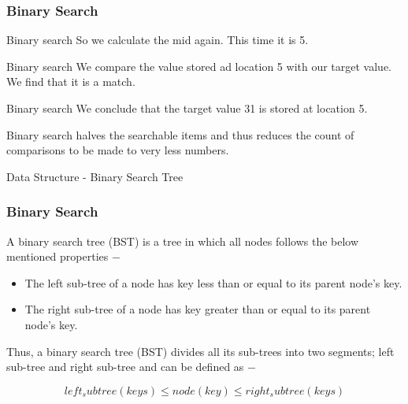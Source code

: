 \documentclass{beamer}
\begin{document}
\begin{frame}
\frametitle{Binary Search}
\large
Binary search
So we calculate the mid again. This time it is 5.

Binary search
We compare the value stored ad location 5 with our target value. We find that it is a match.

Binary search
We conclude that the target value 31 is stored at location 5.

Binary search halves the searchable items and thus reduces the count of comparisons to be made to very less numbers.
\end{frame}
%
%
%
%   
%   
%      
%         
%
%
%   
\begin{frame}

Data Structure - Binary Search Tree

\end{frame}
\begin{frame}
\frametitle{Binary Search}
\large
A binary search tree (BST) is a tree in which all nodes follows the below mentioned properties −

\begin{itemize}
\item The left sub-tree of a node has key less than or equal to its parent node's key.
\item The right sub-tree of a node has key greater than or equal to its parent node's key.
\end{itemize}
Thus, a binary search tree (BST) divides all its sub-trees into two segments; left sub-tree and right sub-tree and can be defined as −

\[left_subtree (keys)  \leq  node (key)  \leq  right_subtree (keys)\]
\end{frame}
\end{document}
